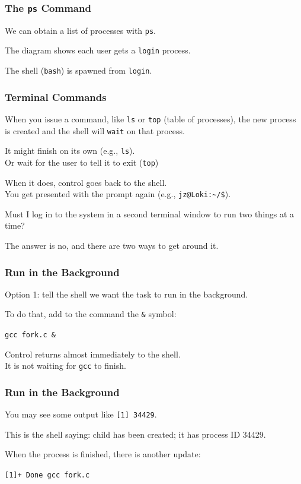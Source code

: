 \begin{frame}
\frametitle{The \texttt{ps} Command}

We can obtain a list of processes with \texttt{ps}.

The diagram shows each user gets a \texttt{login} process.

The shell (\texttt{bash}) is spawned from \texttt{login}.

\end{frame}

\begin{frame}
\frametitle{Terminal Commands}

When you issue a command, like \texttt{ls} or \texttt{top} (table of processes), the new process is created and the shell will \texttt{wait} on that process.

It might finish on its own (e.g., \texttt{ls}).\\
\quad Or wait for the user to tell it to exit (\texttt{top})

When it does, control goes back to the shell.\\
\quad You get presented with the prompt again (e.g., \texttt{jz@Loki:\~{}/\$}).

Must I log in to the system in a second terminal window to run two things at a time? 

The answer is no, and there are two ways to get around it.

\end{frame}

\begin{frame}
\frametitle{Run in the Background}

Option 1: tell the shell we want the task to run in the background. 

To do that, add to the command the \texttt{\&} symbol: 

\texttt{gcc fork.c \&}

Control returns almost immediately to the shell.\\
\quad It is not waiting for \texttt{gcc} to finish.

\end{frame}

\begin{frame}
\frametitle{Run in the Background}

 You may see some output like \texttt{[1] 34429}.
 
This is the shell saying: child has been created; it has process ID 34429. 

When the process is finished, there is another update:

\texttt{[1]+  Done                    gcc fork.c}

\end{frame}

